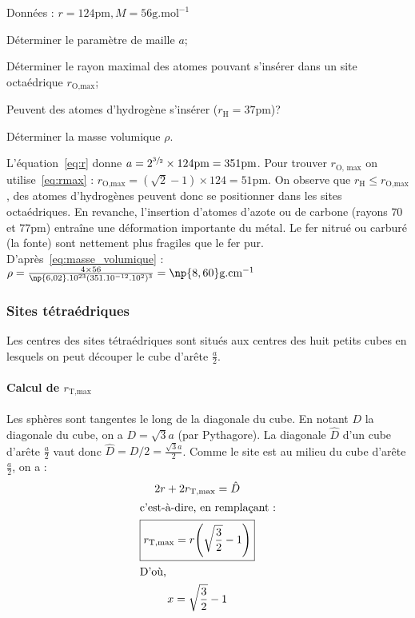 \begin{ex}
    Données : $r = 124\text{pm}, M = 56\text{g.mol}^{-1}$
    \begin{compactitem}
        \item Déterminer le paramètre de maille $a$;
        \item Déterminer le rayon maximal des atomes pouvant s'insérer dans un
            site octaédrique $r_{\text{O,max}}$;
        \item Peuvent des atomes d'hydrogène s'insérer ($r_{\text{H}} = 37$pm)?
        \item Déterminer la masse volumique $\rho$.
    \end{compactitem}
    L'équation~\ref{eq:r} donne
    $a=2^{\sfrac{3}{2}} \times 124\text{pm} = 351\text{pm}$.
    Pour trouver $r_{\text{O, max}}$ on utilise~\ref{eq:rmax} :
    $r_{\text{O,max}} = (\sqrt{2} - 1)\times 124 = 51\text{pm}$.
    On observe que $r_{\text{H}} \leq r_{\text{O,max}}$, des atomes
    d'hydrogènes peuvent donc se positionner dans les sites
    octaédriques. En revanche, l'insertion d'atomes d'azote ou de
    carbone (rayons $70$ et $77$pm) entraîne une déformation importante
    du métal. Le fer nitrué ou carburé (la fonte) sont nettement
    plus fragiles que le fer pur.
    D'après~\ref{eq:masse_volumique} :
    $\rho = \frac{4 \times 56}{\np{6,02}.10^{23}(351.10^{-12}.10^2)^3} = \np{8,60}\text{g.cm}^{-1}$
\end{ex}

\subsubsection{Sites tétraédriques}
Les centres des sites tétraédriques sont situés aux centres des
huit petits cubes en lesquels on peut découper le cube d’arête
$\frac{a}{2}$.
\paragraph{Calcul de $r_{\text{T,max}}$}
Les sphères sont tangentes le long de la diagonale du cube.
En notant $D$ la diagonale du cube, on a $D = \sqrt{3}a$
(par Pythagore). La diagonale $\hat{D}$ d'un cube d'arête $\frac{a}{2}$
vaut donc $\hat{D} = D/2 = \frac{\sqrt{3}a}{2}$.
Comme le site est au milieu du cube d'arête $\frac{a}{2}$, on a :
\begin{gather}
    2r + 2r_{\text{T,max}} = \hat{D}\\
    \intertext{c'est-à-dire, en remplaçant :}
    \boxed{r_{\text{T,max}} = r\Biggl(\sqrt{\frac{3}{2}} - 1\Biggr)}\label{eq:rmax_tetra}\\
    \intertext{D'où,}
    x = \sqrt{\frac{3}{2}} - 1
\end{gather}


